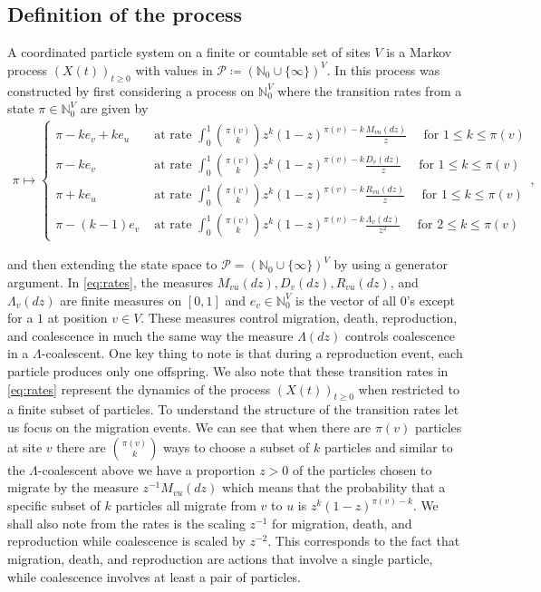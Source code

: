 \documentclass[11pt]{article}
\theoremstyle{definition}
\newcommand{\N}{\mathbb{N}}
\begin{document}
\subsection{Definition of the process}

\noindent A coordinated particle system on a finite or countable set of sites $V$ is a Markov process $(X(t))_{t\geq 0}$ with values in $\mathcal{P} \coloneqq (\N_0 \cup \{\infty\})^V$. In \cite{CPS2021} this process was constructed by first considering a process on $\N_0^V$ where the transition rates from a state $\pi \in \N_0^V$ are given by
%
    \begin{align}\label{eq:rates}
        \pi \mapsto \begin{cases}
        \pi-ke_v+ke_u & \text{ at rate } \int_{0}^1 \binom{\pi(v)}{k}z^k(1-z)^{\pi(v)-k} \frac{M_{vu}(dz)}{z}\quad\text{ for } 1 \leq k \leq \pi(v)\\
        \pi - ke_v & \text{ at rate } \int_{0}^1 \binom{\pi(v)}{k}z^k(1-z)^{\pi(v)-k} \frac{D_{v}(dz)}{z}\quad\text{ for } 1 \leq k \leq \pi(v)\\
        \pi + ke_u & \text{ at rate } \int_{0}^1 \binom{\pi(v)}{k}z^k(1-z)^{\pi(v)-k} \frac{R_{vu}(dz)}{z}\quad\text{ for } 1 \leq k \leq \pi(v)\\
        \pi - (k-1)e_v & \text{ at rate } \int_{0}^1 \binom{\pi(v)}{k}z^k(1-z)^{\pi(v)-k} \frac{\Lambda_{v}(dz)}{z^2}\quad \text{ for } 2 \leq k \leq \pi(v)
        \end{cases},
    \end{align}

\noindent and then extending the state space to $\mathcal{P} = (\N_0 \cup \{\infty\})^V$ by using a generator argument. In \eqref{eq:rates}, the measures $M_{vu}(dz), D_{v}(dz), R_{vu}(dz)$, and $\Lambda_{v}(dz)$ are finite measures on $[0,1]$ and $e_v \in \N_0^V$ is the vector of all $0$'s except for a $1$ at position $v \in V$. These measures control migration, death, reproduction, and coalescence in much the same way the measure $\Lambda(dz)$ controls coalescence in a $\Lambda$-coalescent. One key thing to note is that during a reproduction event, each particle produces only one offspring. We also note that these transition rates in \eqref{eq:rates} represent the dynamics of the process $(X(t))_{t\geq 0}$ when restricted to a finite subset of particles. To understand the structure of the transition rates let us focus on the migration events. We can see that when there are $\pi(v)$ particles at site $v$ there are $\binom{\pi(v)}{k}$ ways to choose a subset of $k$ particles and similar to the $\Lambda$-coalescent above we have a proportion $z > 0$ of the particles chosen to migrate by the measure $z^{-1}M_{vu}(dz)$ which means that the probability that a specific subset of $k$ particles all migrate from $v$ to $u$ is $z^k(1-z)^{\pi(v) - k}$. We shall also note from the rates is the scaling $z^{-1}$ for migration, death, and reproduction while coalescence is scaled by $z^{-2}$. This corresponds to the fact that migration, death, and reproduction are actions that involve a single particle, while coalescence involves at least a pair of particles. 
\medskip
\end{document}
